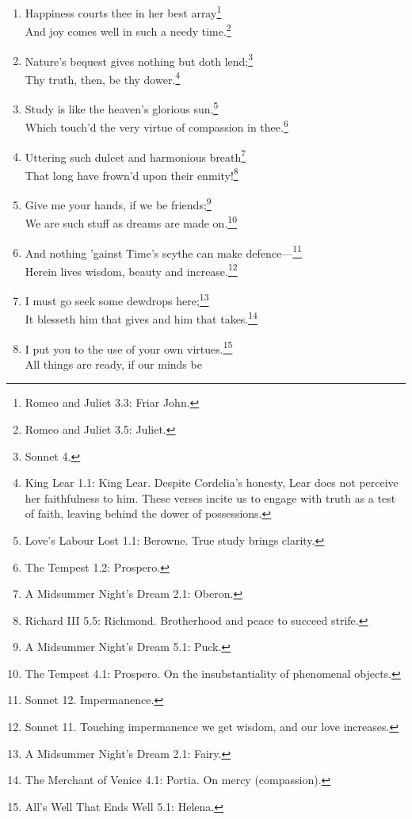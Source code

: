 \documentclass[17pt,twoside]{extarticle}
\begin{document}
\begin{enumerate}
  And thus the native hue of resolution\footnote{Hamlet, Prince of
    Denmark 3.1: Hamlet.}\\Lies rich in virtue and unmingled.\footnote{Troilus
    and Cressida 1.3: Agamemnon.}
\item
  Happiness courts thee in her best array\footnote{Romeo and Juliet 3.3:
    Friar John.}\\And joy comes well in such a needy time.\footnote{Romeo
    and Juliet 3.5: Juliet.}
\item
  Nature's bequest gives nothing but doth lend;\footnote{Sonnet 4.}\\Thy
  truth, then, be thy dower.\footnote{King Lear 1.1: King Lear. Despite
    Cordelia's honesty, Lear does not perceive her faithfulness to him.
    These verses incite us to engage with truth as a test of faith,
    leaving behind the dower of possessions.}
\item
  Study is like the heaven's glorious sun,\footnote{Love's Labour Lost
    1.1: Berowne. True study brings clarity.}\\Which touch'd the very
  virtue of compassion in thee.\footnote{The Tempest 1.2: Prospero.}
\item
  Uttering such dulcet and harmonious breath\footnote{A Midsummer
    Night's Dream 2.1: Oberon.}\\That long have frown'd upon their
  enmity!\footnote{Richard III 5.5: Richmond. Brotherhood and peace to
    succeed strife.}
\item
  Give me your hands, if we be friends;\footnote{A Midsummer Night's
    Dream 5.1: Puck.}\\We are such stuff as dreams are made
  on.\footnote{The Tempest 4.1: Prospero. On the insubstantiality of
    phenomenal objects.}
\item
  And nothing 'gainst Time's scythe can make defence---\footnote{Sonnet
    12. Impermanence.}\\Herein lives wisdom, beauty and
  increase.\footnote{Sonnet 11. Touching impermanence we get wisdom, and
    our love increases.}
\item
  I must go seek some dewdrops here;\footnote{A Midsummer Night's Dream
    2.1: Fairy.}\\It blesseth him that gives and him that
  takes.\footnote{The Merchant of Venice 4.1: Portia. On mercy
    (compassion).}
\item
  I put you to the use of your own virtues.\footnote{All's Well That
    Ends Well 5.1: Helena.}\\All things are ready, if our minds be

\end{enumerate}
\end{document}
